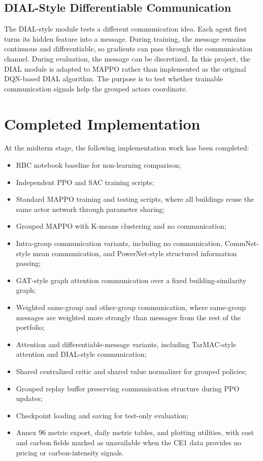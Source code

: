 \subsection{DIAL-Style Differentiable Communication}

The DIAL-style module tests a different communication idea. Each agent first
turns its hidden feature into a message. During training, the message remains
continuous and differentiable, so gradients can pass through the communication
channel. During evaluation, the message can be discretized. In this project, the
DIAL module is adapted to MAPPO rather than implemented as the original
DQN-based DIAL algorithm. The purpose is to test whether trainable
communication signals help the grouped actors coordinate.

\section{Completed Implementation}

At the midterm stage, the following implementation work has been completed:

\begin{itemize}
  \item RBC notebook baseline for non-learning comparison;
  \item Independent PPO and SAC training scripts;
  \item Standard MAPPO training and testing scripts, where all buildings reuse
  the same actor network through parameter sharing;
  \item Grouped MAPPO with K-means clustering and no communication;
  \item Intra-group communication variants, including no communication,
  CommNet-style mean communication, and PowerNet-style structured information
  passing;
  \item GAT-style graph attention communication over a fixed building-similarity
  graph;
  \item Weighted same-group and other-group communication, where same-group
  messages are weighted more strongly than messages from the rest of the
  portfolio;
  \item Attention and differentiable-message variants, including TarMAC-style
  attention and DIAL-style communication;
  \item Shared centralized critic and shared value normalizer for grouped
  policies;
  \item Grouped replay buffer preserving communication structure during PPO
  updates;
  \item Checkpoint loading and saving for test-only evaluation;
  \item Annex 96 metric export, daily metric tables, and plotting utilities,
  with cost and carbon fields marked as unavailable when the CE1 data provides
  no pricing or carbon-intensity signals.
\end{itemize}

